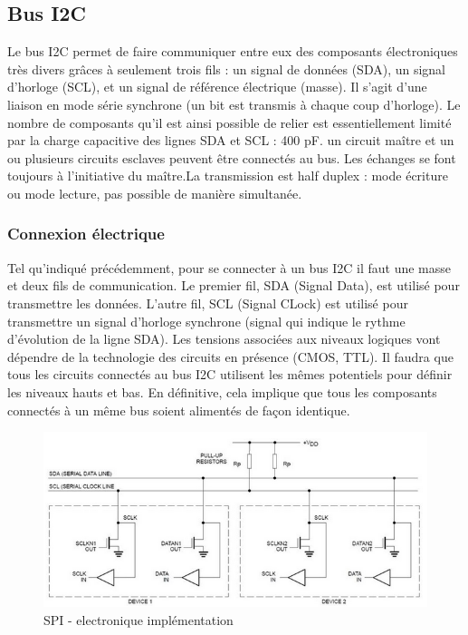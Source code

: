 \documentclass[french,a4paper,12pt]{report}
\begin{document}
 
 			\subsection{Bus I2C}
 			
 			Le bus I2C permet de faire communiquer entre eux des composants électroniques très divers grâces à seulement trois fils : un signal de données (SDA), un signal d'horloge (SCL), et un signal de référence électrique (masse).
Il s'agit d'une liaison en mode série synchrone (un bit est transmis à chaque coup d’horloge). Le nombre de composants qu'il est ainsi possible de relier est essentiellement limité par la charge capacitive des lignes SDA et SCL : 400 pF.
un circuit maître et un ou plusieurs circuits esclaves peuvent être connectés au bus. Les échanges se font toujours à l’initiative du maître.La transmission est half duplex : mode écriture ou mode lecture, pas possible de manière simultanée.
 
  		\subsubsection{Connexion électrique}
  		
  		Tel qu'indiqué précédemment, pour se connecter à un bus I2C il faut une masse et deux fils de communication. Le premier fil, SDA (Signal Data), est utilisé pour transmettre les données. L'autre fil, SCL (Signal CLock) est utilisé pour transmettre un signal d'horloge synchrone (signal qui indique le rythme d'évolution de la ligne SDA). Les tensions associées aux niveaux logiques vont dépendre de la technologie des circuits en présence (CMOS, TTL). Il faudra que tous les circuits connectés au bus I2C utilisent les mêmes potentiels pour définir les niveaux hauts et bas. En définitive, cela implique que tous les composants connectés à un même bus soient alimentés de façon identique.
  		
  \begin{figure}[!ht]
    \center
  	\includegraphics[width=12cm]{SPI5.png}
    \caption{SPI - electronique implémentation}
	\end{figure}
 
\end{document}
